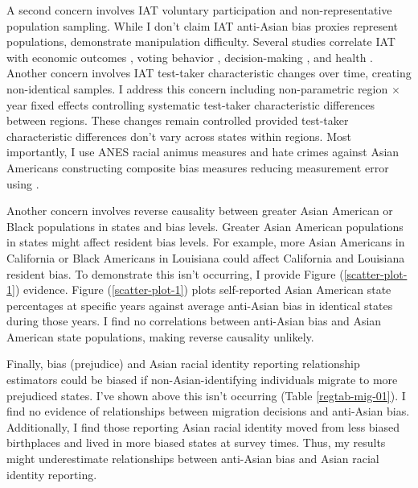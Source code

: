 A second concern involves IAT voluntary participation and non-representative population sampling. While I don't claim IAT anti-Asian bias proxies represent populations, \textcite{egloffPredictiveValidityImplicit2002} demonstrate manipulation difficulty. Several studies correlate IAT with economic outcomes \autocite{chettyRaceEconomicOpportunity2020,gloverDiscriminationSelfFulfillingProphecy2017}, voting behavior \autocite{friesePredictingVotingBehavior2007}, decision-making \autocite{bertrandImplicitDiscrimination2005,carlanaImplicitStereotypesEvidence2019}, and health \autocite{leitnerRacialBiasAssociated2016}. Another concern involves IAT test-taker characteristic changes over time, creating non-identical samples. I address this concern including non-parametric region $\times$ year fixed effects controlling systematic test-taker characteristic differences between regions. These changes remain controlled provided test-taker characteristic differences don't vary across states within regions. Most importantly, I use ANES racial animus measures and hate crimes against Asian Americans constructing composite bias measures reducing measurement error using \textcite{lubotskyInterpretationRegressionsMultiple2006}.

Another concern involves reverse causality between greater Asian American or Black populations in states and bias levels. Greater Asian American populations in states might affect resident bias levels. For example, more Asian Americans in California or Black Americans in Louisiana could affect California and Louisiana resident bias. To demonstrate this isn't occurring, I provide Figure (\ref{scatter-plot-1}) evidence. Figure (\ref{scatter-plot-1}) plots self-reported Asian American state percentages at specific years against average anti-Asian bias in identical states during those years. I find no correlations between anti-Asian bias and Asian American state populations, making reverse causality unlikely.

Finally, bias (prejudice) and Asian racial identity reporting relationship estimators could be biased if non-Asian-identifying individuals migrate to more prejudiced states. I've shown above this isn't occurring (Table \ref{regtab-mig-01}). I find no evidence of relationships between migration decisions and anti-Asian bias. Additionally, I find those reporting Asian racial identity moved from less biased birthplaces and lived in more biased states at survey times. Thus, my results might underestimate relationships between anti-Asian bias and Asian racial identity reporting.

